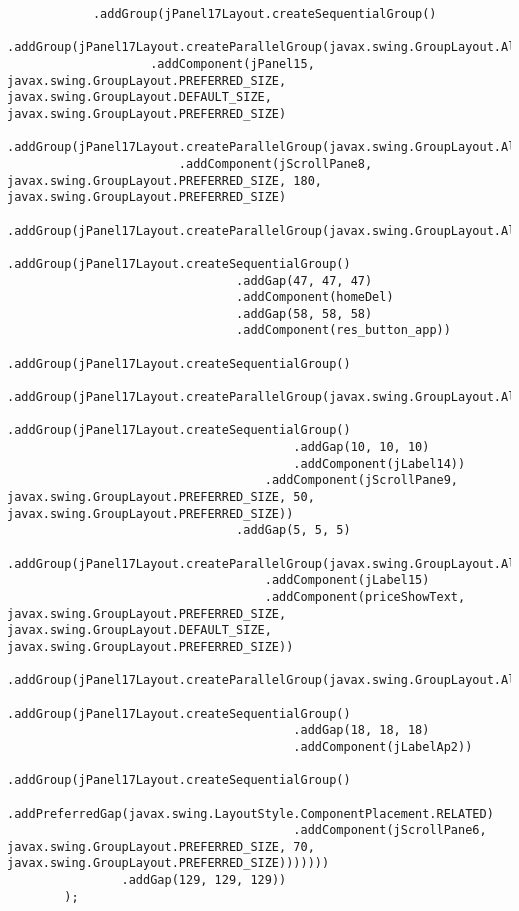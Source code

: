 \documentclass[12pt,a4paper]{article}
\begin{document}
\begin{lstlisting}
            .addGroup(jPanel17Layout.createSequentialGroup()
                .addGroup(jPanel17Layout.createParallelGroup(javax.swing.GroupLayout.Alignment.TRAILING)
                    .addComponent(jPanel15, javax.swing.GroupLayout.PREFERRED_SIZE, javax.swing.GroupLayout.DEFAULT_SIZE, javax.swing.GroupLayout.PREFERRED_SIZE)
                    .addGroup(jPanel17Layout.createParallelGroup(javax.swing.GroupLayout.Alignment.LEADING)
                        .addComponent(jScrollPane8, javax.swing.GroupLayout.PREFERRED_SIZE, 180, javax.swing.GroupLayout.PREFERRED_SIZE)
                        .addGroup(jPanel17Layout.createParallelGroup(javax.swing.GroupLayout.Alignment.TRAILING)
                            .addGroup(jPanel17Layout.createSequentialGroup()
                                .addGap(47, 47, 47)
                                .addComponent(homeDel)
                                .addGap(58, 58, 58)
                                .addComponent(res_button_app))
                            .addGroup(jPanel17Layout.createSequentialGroup()
                                .addGroup(jPanel17Layout.createParallelGroup(javax.swing.GroupLayout.Alignment.LEADING)
                                    .addGroup(jPanel17Layout.createSequentialGroup()
                                        .addGap(10, 10, 10)
                                        .addComponent(jLabel14))
                                    .addComponent(jScrollPane9, javax.swing.GroupLayout.PREFERRED_SIZE, 50, javax.swing.GroupLayout.PREFERRED_SIZE))
                                .addGap(5, 5, 5)
                                .addGroup(jPanel17Layout.createParallelGroup(javax.swing.GroupLayout.Alignment.BASELINE)
                                    .addComponent(jLabel15)
                                    .addComponent(priceShowText, javax.swing.GroupLayout.PREFERRED_SIZE, javax.swing.GroupLayout.DEFAULT_SIZE, javax.swing.GroupLayout.PREFERRED_SIZE))
                                .addGroup(jPanel17Layout.createParallelGroup(javax.swing.GroupLayout.Alignment.LEADING)
                                    .addGroup(jPanel17Layout.createSequentialGroup()
                                        .addGap(18, 18, 18)
                                        .addComponent(jLabelAp2))
                                    .addGroup(jPanel17Layout.createSequentialGroup()
                                        .addPreferredGap(javax.swing.LayoutStyle.ComponentPlacement.RELATED)
                                        .addComponent(jScrollPane6, javax.swing.GroupLayout.PREFERRED_SIZE, 70, javax.swing.GroupLayout.PREFERRED_SIZE)))))))
                .addGap(129, 129, 129))
        );


\end{lstlisting}
\end{document}

